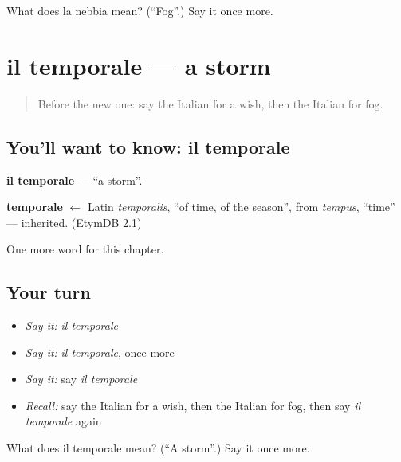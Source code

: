 \begin{tcolorbox}[breakable,colback=teal!4,colframe=teal!35!black,title={Before you move on}]
What does la nebbia mean? (\textquotedblleft{}Fog\textquotedblright{}.) Say it once more.
\end{tcolorbox}
\section[il temporale]{il temporale — a storm}

\label{lesson:IT-C118-temporale}



\begin{quote}
Before the new one: say the Italian for a wish, then the Italian for fog.
\end{quote}

\subsection*{You'll want to know: il temporale}
\textbf{il temporale} — \textquotedblleft{}a storm\textquotedblright{}.

\begin{cousinweb}
\textbf{temporale} $\leftarrow$ Latin \emph{temporalis}, \textquotedblleft{}of time, of the season\textquotedblright{}, from \emph{tempus}, \textquotedblleft{}time\textquotedblright{} — inherited. (EtymDB 2.1)
\end{cousinweb}

\begin{grammarlens}[title={What you've built}]
One more word for this chapter.
\end{grammarlens}

\subsection*{Your turn}
\begin{itemize}
\raggedright
  \item \emph{Say it:} \emph{il temporale}
  \item \emph{Say it:} \emph{il temporale}, once more
  \item \emph{Say it:} say \emph{il temporale}
  \item \emph{Recall:} say the Italian for a wish, then the Italian for fog, then say \emph{il temporale} again
\end{itemize}

\begin{tcolorbox}[breakable,colback=teal!4,colframe=teal!35!black,title={Before you move on}]
What does il temporale mean? (\textquotedblleft{}A storm\textquotedblright{}.) Say it once more.
\end{tcolorbox}
